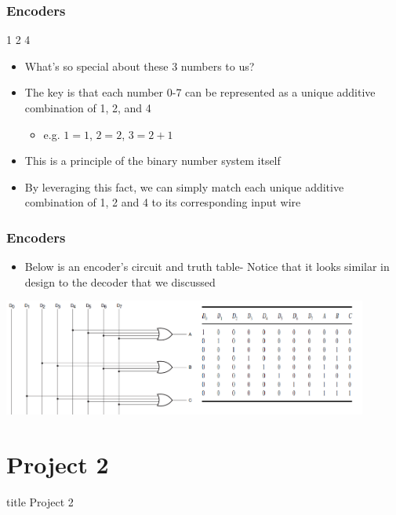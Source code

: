 \documentclass{beamer}
\begin{document}
       	\begin{frame}
       		\frametitle{Encoders}
       		\begin{center}
       			\LARGE{1 2 4}
       		\end{center}
       		\begin{itemize}
       			\item What's so special about these 3 numbers to us?
       			\item The key is that each number 0-7 can be represented as a unique additive combination of 1, 2, and 4
       			\begin{itemize}
       				\item e.g. $1=1$, $2=2$, $3=2+1$
       			\end{itemize}
       			\item This is a principle of the binary number system itself
       			\item By leveraging this fact, we can simply match each unique additive combination of 1, 2 and 4 to its corresponding input wire
       		\end{itemize}
       		
       	
       	\end{frame}
       	
       	\begin{frame}
       		\frametitle{Encoders}
       		\begin{itemize}
       			\item Below is an encoder's circuit and truth table- Notice that it looks similar in design to the decoder that we discussed\linebreak
       		\end{itemize}
       		\centering
       		\includegraphics[width=0.9\textwidth]{encoder}
       	\end{frame}  	
    
    \section{Project 2}
    
    	\begin{frame}
         	\vfill
         	\centering
          	\begin{beamercolorbox}[sep=8pt,center,shadow=true,rounded=true]{title}
           	Project 2\par%
        	\end{beamercolorbox}
            \vfill
       	\end{frame}
\end{document}
